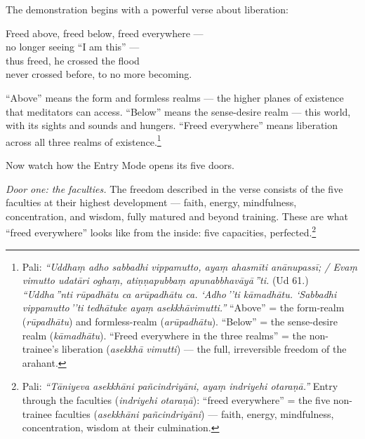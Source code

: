 The demonstration begins with a powerful verse about liberation:

\begin{versebox}
Freed above, freed below, freed everywhere ---\\
no longer seeing ``I am this'' ---\\
thus freed, he crossed the flood\\
never crossed before, to no more becoming.
\end{versebox}

``Above'' means the form and formless realms --- the higher planes of existence that meditators can access. ``Below'' means the sense-desire realm --- this world, with its sights and sounds and hungers. ``Freed everywhere'' means liberation across all three realms of existence.\footnote{Pali: \textit{``Uddhaṃ adho sabbadhi vippamutto, ayaṃ ahasmīti anānupassī; / Evaṃ vimutto udatāri oghaṃ, atiṇṇapubbaṃ apunabbhavāyā\,''ti.} (Ud 61.) \textit{``Uddha\,''nti rūpadhātu ca arūpadhātu ca. `Adho\,''ti kāmadhātu. `Sabbadhi vippamutto\,''ti tedhātuke ayaṃ asekkhāvimutti.''} ``Above'' = the form-realm (\textit{rūpadhātu}) and formless-realm (\textit{arūpadhātu}). ``Below'' = the sense-desire realm (\textit{kāmadhātu}). ``Freed everywhere in the three realms'' = the non-trainee's liberation (\textit{asekkhā vimutti}) --- the full, irreversible freedom of the arahant.}

Now watch how the Entry Mode opens its five doors.

\textit{Door one: the faculties.} The freedom described in the verse consists of the five faculties at their highest development --- faith, energy, mindfulness, concentration, and wisdom, fully matured and beyond training. These are what ``freed everywhere'' looks like from the inside: five capacities, perfected.\footnote{Pali: \textit{``Tāniyeva asekkhāni pañcindriyāni, ayaṃ indriyehi otaraṇā.''} Entry through the faculties (\textit{indriyehi otaraṇā}): ``freed everywhere'' = the five non-trainee faculties (\textit{asekkhāni pañcindriyāni}) --- faith, energy, mindfulness, concentration, wisdom at their culmination.}

